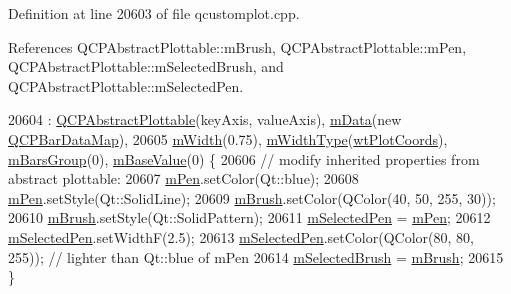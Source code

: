 Definition at line 20603 of file qcustomplot.\+cpp.



References Q\+C\+P\+Abstract\+Plottable\+::m\+Brush, Q\+C\+P\+Abstract\+Plottable\+::m\+Pen, Q\+C\+P\+Abstract\+Plottable\+::m\+Selected\+Brush, and Q\+C\+P\+Abstract\+Plottable\+::m\+Selected\+Pen.


\begin{DoxyCode}
20604     : \hyperlink{class_q_c_p_abstract_plottable_af78a036e40db6f53a31abadc5323715a}{QCPAbstractPlottable}(keyAxis, valueAxis), \hyperlink{class_q_c_p_bars_aef28d29d51ef84b608ecd22c55d531ff}{mData}(\textcolor{keyword}{new} 
      \hyperlink{qcustomplot_8h_aa846c77472cae93def9f1609d0c57191}{QCPBarDataMap}),
20605       \hyperlink{class_q_c_p_bars_a7c4e0f2246f8133f48a9c3f24cf5b920}{mWidth}(0.75), \hyperlink{class_q_c_p_bars_a94dba1309496c7601d01e2c59715cbb3}{mWidthType}(\hyperlink{class_q_c_p_bars_a65dbbf1ab41cbe993d71521096ed4649aad3cc60ae1bfb1160a30237bee9eaf10}{wtPlotCoords}), 
      \hyperlink{class_q_c_p_bars_a9f59c255f3739182ca9744dff75beaa9}{mBarsGroup}(0), \hyperlink{class_q_c_p_bars_aa0515cf47fa6044cc28e59b1ae5ec759}{mBaseValue}(0) \{
20606   \textcolor{comment}{// modify inherited properties from abstract plottable:}
20607   \hyperlink{class_q_c_p_abstract_plottable_a67bc0622fd1b9fa14e54c14922dcec66}{mPen}.setColor(Qt::blue);
20608   \hyperlink{class_q_c_p_abstract_plottable_a67bc0622fd1b9fa14e54c14922dcec66}{mPen}.setStyle(Qt::SolidLine);
20609   \hyperlink{class_q_c_p_abstract_plottable_a33f00674c0161c13315ab9da0895418e}{mBrush}.setColor(QColor(40, 50, 255, 30));
20610   \hyperlink{class_q_c_p_abstract_plottable_a33f00674c0161c13315ab9da0895418e}{mBrush}.setStyle(Qt::SolidPattern);
20611   \hyperlink{class_q_c_p_abstract_plottable_a10619472f5d5e10e9519a599f1cf5576}{mSelectedPen} = \hyperlink{class_q_c_p_abstract_plottable_a67bc0622fd1b9fa14e54c14922dcec66}{mPen};
20612   \hyperlink{class_q_c_p_abstract_plottable_a10619472f5d5e10e9519a599f1cf5576}{mSelectedPen}.setWidthF(2.5);
20613   \hyperlink{class_q_c_p_abstract_plottable_a10619472f5d5e10e9519a599f1cf5576}{mSelectedPen}.setColor(QColor(80, 80, 255)); \textcolor{comment}{// lighter than Qt::blue of mPen}
20614   \hyperlink{class_q_c_p_abstract_plottable_aea3c0da30c7a8be23ad5f2d9bca36762}{mSelectedBrush} = \hyperlink{class_q_c_p_abstract_plottable_a33f00674c0161c13315ab9da0895418e}{mBrush};
20615 \}
\end{DoxyCode}
\hypertarget{class_q_c_p_bars_a4d880e28031ef120603f543379be2f22}{}
